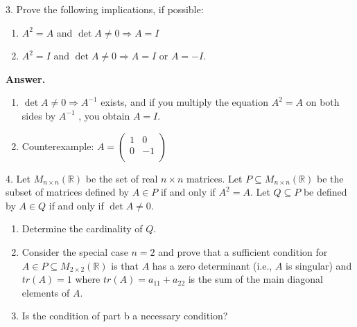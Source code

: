 \documentclass[10pt,]{book}
\theoremstyle{plain}
\theoremstyle{definition}
\theoremstyle{definition}
\theoremstyle{definition}
\theoremstyle{definition}
\begin{document}
\begin{exercisegroup}
\item[3.]\hypertarget{exercise-24}{} Prove the following implications, if possible:%
\par
\leavevmode%
\begin{enumerate}[label=\alph*]
\item\hypertarget{li-112}{} \(A^2= A\) and \(\det  A \neq  0 \Rightarrow  A =I\)%
\item\hypertarget{li-113}{} \(A^2 = I \textrm{ and } \det A \neq  0 \Rightarrow  A = I \textrm{ or } A = -I\).%
\end{enumerate}
%
\par\smallskip
\par\smallskip
\noindent\textbf{Answer.}\hypertarget{answer-13}{}\quad
\leavevmode%
\begin{enumerate}[label=\alph*]
\item\hypertarget{li-114}{} \(\det  A \neq 0\Rightarrow A^{-1}\) exists, and if you multiply the equation \(A^2=A\) on both sides by \(A^{-1}\) , you obtain \(A=I\).%
\item\hypertarget{li-115}{} Counterexample: \(A=\left(
\begin{array}{cc}
 1 & 0 \\
 0 & -1 \\
\end{array}
\right)\)
%
\end{enumerate}
%
\item[4.]\hypertarget{exercise-25}{} Let \(M_{n\times n}(\mathbb{R})\) be the set of real \(n\times n\) matrices. Let \(P \subseteq  M_{n\times n}(\mathbb{R})\) be the subset of matrices defined by \(A \in  P\) if and only if \(A^2 = A\). Let \(Q \subseteq  P\) be defined by \(A\in Q\) if and only if \(\det A \neq  0\).%
\par
\leavevmode%
\begin{enumerate}[label=\alph*]
\item\hypertarget{li-116}{} Determine the cardinality of \(Q\).%
\item\hypertarget{li-117}{} Consider the special case \(n = 2\) and prove that a sufficient condition for \(A \in  P \subseteq  M_{2\times 2}(\mathbb{R})\) is that \(A\) has a zero determinant (i.e., \(A\) is singular) and \(tr(A) = 1\) where \(tr(A) = a_{11}+ a _{22}\) is the sum of the main diagonal elements of \(A\).%
\item\hypertarget{li-118}{} Is the condition of part b a necessary condition?%
\end{enumerate}
%
\par\smallskip
\end{exercisegroup}
\end{document}
